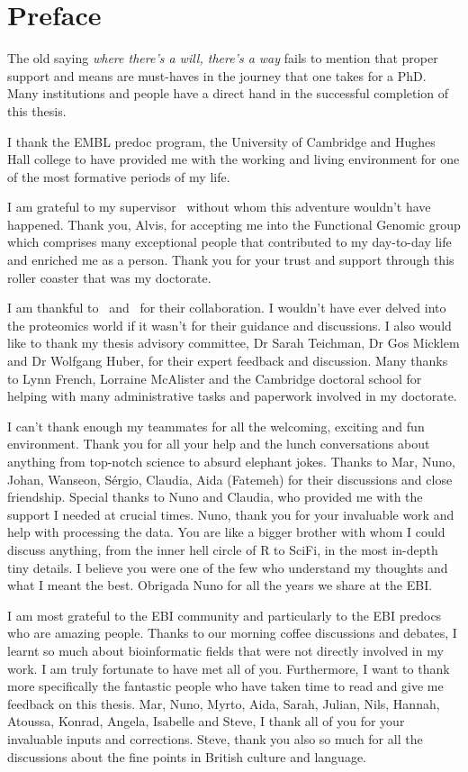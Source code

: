 \chapter*{Preface}
\label{ch:acknowledgements}
\vspace{-1cm}
The old saying \emph{where there's a will, there's a way} fails to mention that
proper support and means are must-haves in the journey that one takes for a PhD.
Many institutions and people have
a direct hand in the successful completion of this thesis.

I thank the EMBL predoc program, the University of Cambridge
and Hughes Hall college to have provided me
with the working and living environment
for one of the most formative periods of my life.

I am grateful to my supervisor \alvis\
without whom this adventure wouldn't have happened.
Thank you, Alvis, for accepting me into the Functional Genomic group
which comprises many exceptional people
that contributed to my day-to-day life and enriched me as a person.
Thank you for your trust and support
through this roller coaster that was my doctorate.

I am thankful to \jyoti\ and \james\ for their collaboration.
I wouldn't have ever delved into the proteomics world
if it wasn't for their guidance and discussions.
I also would like to thank my thesis advisory committee,
Dr Sarah Teichman, Dr Gos Micklem and Dr Wolfgang Huber,
for their expert feedback and discussion.
Many thanks to Lynn French, Lorraine McAlister and the Cambridge doctoral school
for helping with many administrative tasks and paperwork involved in my doctorate.

I can't thank enough my teammates for all the welcoming,
exciting and fun environment.
Thank you for all your help and the lunch conversations about anything
from top-notch science to absurd elephant jokes.
Thanks to Mar, Nuno, Johan, Wanseon, Sérgio, Claudia, Aida (Fatemeh)
for their discussions and close friendship.
Special thanks to Nuno and Claudia,
who provided me with the support I needed at crucial times.
Nuno, thank you for your invaluable work and help with processing the data.
You are like a bigger brother with whom I could discuss anything,
from the inner hell circle of R to SciFi, in the most in-depth tiny details.
I believe you were one of the few who understand my thoughts and what I meant the best.
Obrigada Nuno for all the years we share at the EBI.\@

I am most grateful to the EBI community and
particularly to the EBI predocs who are amazing people.
Thanks to our morning coffee discussions and debates,
I learnt so much about bioinformatic fields that
were not directly involved in my work.
I am truly fortunate to have met all of you.
Furthermore, I want to thank more specifically the fantastic people
who have taken time to read and give me feedback on this thesis.
Mar, Nuno, Myrto, Aida, Sarah, Julian, Nils, Hannah, Atoussa, Konrad, Angela,
Isabelle and Steve, I thank all of you for your invaluable inputs and corrections.
Steve, thank you also so much for all the discussions
about the fine points in British culture and language.

